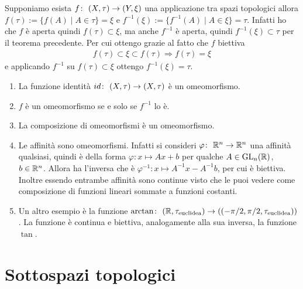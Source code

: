 \begin{remark}
	Supponiamo esista $f \colon\ (X,\tau) \rightarrow (Y,\xi)$ una applicazione tra spazi topologici allora $f(\tau) := \{ f(A) \; | \;  A \in \tau\} = \xi$ e $f^{-1}(\xi) := \{ f^{-1}(A) \; | \;  A \in \xi\} = \tau$. Infatti ho che $f$ è aperta quindi $f(\tau) \subset \xi$, ma anche $f^{-1}$ è aperta, quindi $f^{-1}(\xi) \subset \tau$ per il teorema precedente. Per cui ottengo grazie al fatto che $f$ biettiva
	\begin{equation}
	\begin{aligned}
		f(\tau) \subset \xi \subset f(\tau) \Longrightarrow f(\tau) = \xi
	\end{aligned}
	\end{equation} 
	e applicando $f^{-1}$ su $f(\tau) \subset \xi$ ottengo $f^{-1}(\xi) = \tau$.
\end{remark}

\begin{example}
\begin{enumerate}
	\item La funzione identità $id \colon\ (X,\tau) \rightarrow (X,\tau)$ è un omeomorfismo. 
	\item $f$ è un omeomorfismo se e solo se $f^{-1}$ lo è. 
	\item La composizione di omeomorfismi è un omeomorfismo.
	\item Le affinità sono omeomorfismi. Infatti si consideri $\varphi \colon\ \mathbb{R}^n \rightarrow \mathbb{R}^n$ una affinità qualsiasi, quindi è della forma $\varphi \colon x \mapsto Ax + b$ per qualche $A \in \operatorname{GL}_n(\mathbb{R})$, $b \in \mathbb{R}^n$. Allora ha l'inversa che è $\varphi^{-1} \colon x \mapsto A^{-1}x - A^{-1}b$, per cui è biettiva. Inoltre essendo entrambe affinità sono continue visto che le puoi vedere come composizione di funzioni lineari sommate a funzioni costanti.
	\item Un altro esempio è la funzione $\arctan \colon\ (\mathbb{R}, \tau_{\text{euclidea}}) \rightarrow ((-\pi/2,\pi/2, \tau_{\text{euclidea}}))$. La funzione è continua e biettiva, analogamente alla sua inversa, la funzione $\tan$.
\end{enumerate}
\end{example}

\section{Sottospazi topologici}

